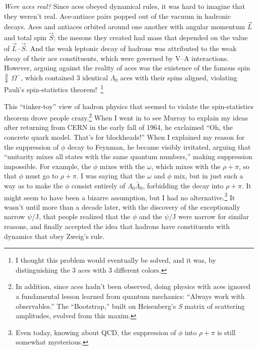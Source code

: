 \documentclass[12pt]{article}
\begin{document}
{\it Were aces real?} Since aces obeyed dynamical rules, it was hard to imagine that they weren't real. Ace-antiace pairs popped out of the vacuum in hadronic decays. Aces and antiaces orbited around one another with angular momentum $\vec L$ and total spin $\vec S$; the mesons they created had mass that depended on the value of $\vec L\cdot\vec S$.
And the weak leptonic decay of hadrons was attributed to the weak decay of their ace constituents, which were governed by V--A interactions. However, arguing against the reality of aces was the existence of the famous spin $3\over2$ $\Omega^-$, which contained 3 identical $\Lambda_0$ aces with their spins aligned, violating Pauli's spin-statistics theorem!~\footnote{I thought this problem would eventually be solved, and it was, by distinguishing the 3 aces with 3 different colors.}

This ``tinker-toy'' view of hadron physics that seemed to violate the spin-statistics theorem drove people crazy.\footnote{In addition, since aces hadn't been observed, doing physics with aces ignored a fundamental lesson learned from quantum mechanics: ``Always work with observables.'' The ``Bootstrap,'' built on Heisenberg's {\it S} matrix of scattering amplitudes, evolved from this maxim.} When I went in to see Murray to explain my ideas after returning from CERN in the early fall of 1964, he exclaimed ``Oh, the concrete quark model. That's for blockheads!'' When I explained my reason for the suppression of $\phi$ decay to Feynman, he became visibly irritated, arguing that ``unitarity mixes all states with the same quantum numbers,'' making suppression impossible. For example, the $\phi$ mixes with the $\omega$, which mixes with the $\rho+\pi$, so that $\phi$ must go to $\rho+\pi$. I was saying that the $\omega$ and $\phi$ mix, but in just such a way as to make the $\phi$ consist entirely of $\Lambda_{0}\bar\Lambda_{0}$, forbidding the decay into $\rho+\pi$. It might seem to have been a bizarre assumption, but I had no alternative.\footnote{Even today, knowing about QCD, the suppression of $\phi$ into $\rho + \pi$ is still somewhat mysterious.} It wasn't until more than a decade later, with the discovery of the exceptionally narrow $\psi$/J, that people realized that the $\phi$ and the $\psi$/J were narrow for similar reasons, and finally accepted the idea that hadrons have constituents with dynamics that obey Zweig's rule.
\end{document}
